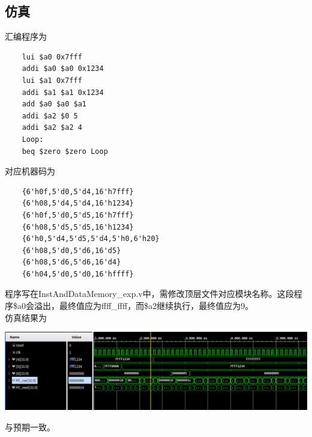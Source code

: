 \documentclass{article}
\begin{document}
\subsection{仿真}
汇编程序为
\begin{lstlisting}
    lui $a0 0x7fff
    addi $a0 $a0 0x1234
    lui $a1 0x7fff
    addi $a1 $a1 0x1234
    add $a0 $a0 $a1
    addi $a2 $0 5
    addi $a2 $a2 4
    Loop:
    beq $zero $zero Loop
\end{lstlisting}
对应机器码为
\begin{lstlisting}
    {6'h0f,5'd0,5'd4,16'h7fff}
    {6'h08,5'd4,5'd4,16'h1234}
    {6'h0f,5'd0,5'd5,16'h7fff}
    {6'h08,5'd5,5'd5,16'h1234}
    {6'h0,5'd4,5'd5,5'd4,5'h0,6'h20}
    {6'h08,5'd0,5'd6,16'd5}
    {6'h08,5'd6,5'd6,16'd4}
    {6'h04,5'd0,5'd0,16'hffff}
\end{lstlisting}
程序写在InstAndDataMemory\_exp.v中，需修改顶层文件对应模块名称。这段程序\$a0会溢出，最终值应为ffff\_ffff，而\$a2继续执行，最终值应为9。\\
仿真结果为
\begin{center}
    \includegraphics[width = 16cm]{images/sim_exp_waveform.png}
\end{center}
与预期一致。
\end{document}
